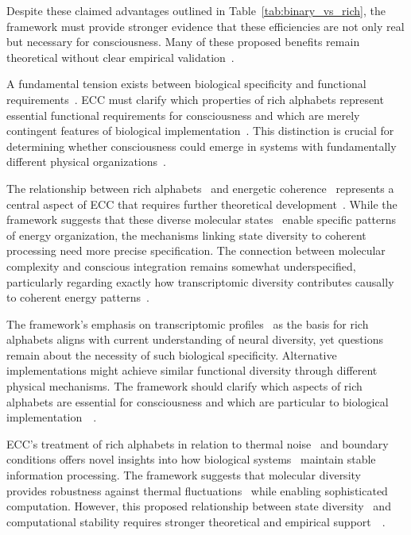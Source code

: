 Despite these claimed advantages outlined in Table~\ref{tab:binary_vs_rich}, the framework must provide stronger evidence that these efficiencies are not only real but necessary for consciousness. Many of these proposed benefits remain theoretical without clear empirical validation~\cite{thompson2014waking, koch2019feeling}.

A fundamental tension exists between biological specificity and functional requirements~\cite{tononi2016integrated}. ECC must clarify which properties of rich alphabets represent essential functional requirements for consciousness and which are merely contingent features of biological implementation~. This distinction is crucial for determining whether consciousness could emerge in systems with fundamentally different physical organizations~\cite{feinberg2016ancient, kauffman2019world}.

The relationship between rich alphabets~ and energetic coherence~ represents a central aspect of ECC that requires further theoretical development~. While the framework suggests that these diverse molecular states~ enable specific patterns of energy organization, the mechanisms linking state diversity to coherent processing need more precise specification. The connection between molecular complexity and conscious integration remains somewhat underspecified, particularly regarding exactly how transcriptomic diversity contributes causally to coherent energy patterns~\cite{goff2019galileo, merleau2012phenomenology}.

The framework's emphasis on transcriptomic profiles~ as the basis for rich alphabets aligns with current understanding of neural diversity, yet questions remain about the necessity of such biological specificity. Alternative implementations might achieve similar functional diversity through different physical mechanisms. The framework should clarify which aspects of rich alphabets are essential for consciousness and which are particular to biological implementation~~\cite{dennett2017bacteria, varela2016embodied}.

ECC's treatment of rich alphabets in relation to thermal noise~ and boundary conditions offers novel insights into how biological systems~ maintain stable information processing. The framework suggests that molecular diversity~ provides robustness against thermal fluctuations~ while enabling sophisticated computation. However, this proposed relationship between state diversity~ and computational stability requires stronger theoretical and empirical support~~\cite{penrose2016fashion, bateson2002mind}.

